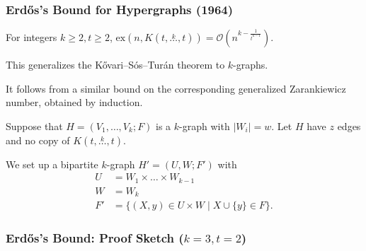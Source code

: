 \documentclass[aspectratio=169]{beamer}
\newcommand{\ex}[2]{\ensuremath{\text{ex} \left( #1, #2 \right)}}
\newcommand{\compoverset}[2]{\ensuremath{K\left(#2, \overset{#1}{\dots}, #2\right)}} %
\newcommand{\bigO}[1]{\ensuremath{\mathcal{O}\left(#1\right)}}
\theoremstyle{mystyle}
\begin{document}
\begin{frame}
    \frametitle{Erd\H{o}s's Bound for Hypergraphs (1964)}

    \begin{theorem}[Erd\H{o}s '64]
        For integers $k \ge 2, t \ge 2$,
        $\ex{n}{\compoverset{k}{t}} = \bigO{n^{k - \frac{1}{t^{k-1}}}}.$
    \end{theorem}

    This generalizes the Kővari--Sós--Turán theorem to $k$-graphs.

    It follows from a similar bound on the corresponding generalized Zarankiewicz number,
    obtained by induction.

    Suppose that $H = (V_1, \dots, V_k; F)$ is a $k$-graph with $|W_i| = w$.
    Let $H$ have $z$ edges and no copy of $\compoverset{k}{t}$.

    We set up a bipartite $k$-graph $H' = (U, W; F')$ with
    \begin{align*}
        U &=  W_1 \times \dots \times W_{k-1} \\
        W &= W_k \\
        F' &= \{(X, y) \in U \times W \mid X \cup \{y\} \in F\}.
    \end{align*}

\end{frame}

\begin{frame}[fragile]
    \frametitle{Erd\H{o}s's Bound: Proof Sketch ($k=3, t=2$)}

    \begin{adjustwidth}{-0.5cm}{0cm} %

        \begin{figure}
            \centering
            \scalebox{0.6}{
                
            }
        \end{figure}

    \end{adjustwidth}

\end{frame}
\end{document}
